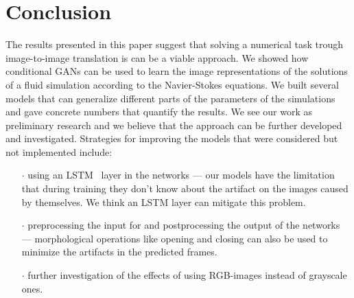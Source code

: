 \documentclass{llncs}
\begin{document}
\section{Conclusion}\label{conclusion}
The results presented in this paper suggest that solving a numerical task trough image-to-image translation is can be a viable approach. We showed how conditional GANs can be used to learn the image representations of the solutions of a fluid simulation according to the Navier-Stokes equations. We built several models that can generalize different parts of the parameters of the simulations and gave concrete numbers that quantify the results.
We see our work as preliminary research and we believe that the approach can be further developed and investigated. Strategies for improving the models that were considered but not implemented include:
\begin{itemize}
\item[$\cdot$] using an LSTM~\cite{lstm} layer in the networks --- our models have the limitation that during training they don't know about the artifact on the images caused by themselves. We think an LSTM layer can mitigate this problem.
\item[$\cdot$] preprocessing the input for and postprocessing the output of the networks --- morphological operations like opening and closing can also be used to minimize the artifacts in the predicted frames.
\item[$\cdot$] further investigation of the effects of using RGB-images instead of grayscale ones.
\end{itemize}
\clearpage
\end{document}
